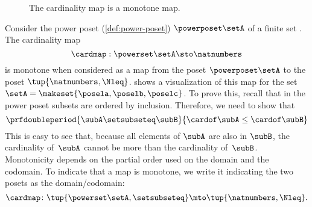 \begin{figure*}[b]
    \centering
    \caption{The cardinality map is a monotone map. }
    \label{fig:cardinality}
\end{figure*}

\begin{example}\label{exa:cardinality}
    Consider the power poset (\cref{def:power-poset}) $\powerposet\setA$ of a finite set \setA.
    The cardinality map
    \begin{equation}\label{eq:cardinality-map}
        \cardmap : \powerset\setA \sto \natnumbers
    \end{equation}
    is monotone when considered as a map from the poset $\powerposet\setA$ to the poset $\tup{\natnumbers,\Nleq}$.
     shows a visualization of this map for the set~$\setA=\makeset{\posela,\poselb,\poselc}$.
    To prove this, recall that in the power poset subsets are ordered by inclusion.
    Therefore, we need to show that
    \begin{equation}\label{eq:cardinality}
        \prfdoubleperiod{
            \subA \setsubseteq \subB
        }{
            \cardof \subA  \leq  \cardof \subB
        }
    \end{equation}
    This is easy to see that, because all elements of $\subA$ are also in $\subB$, the cardinality of~$\subA$ cannot be more than the cardinality of~$\subB$.
    Monotonicity depends on the partial order used on the domain and the codomain.
    To indicate that a map is monotone, we write it indicating the two posets as the domain/codomain:
    \begin{equation}\label{eq:cardinality-as-posmap}
        \cardmap \colon \tup{\powerset\setA, \setsubseteq} \mto \tup{\natnumbers, \Nleq}.
    \end{equation}
\end{example}

